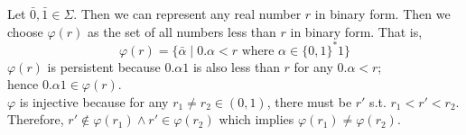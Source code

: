 \documentclass{report}
\begin{document}
Let $\bar{0}, \bar{1} \in \Sigma$. Then we can represent any real number $r$ in binary form.
Then we choose $\varphi(r)$ as the set of all numbers less than $r$ in binary form.
That is,
$$
\varphi(r) = \{\bar{\alpha} \mid 0.\alpha < r \text{ where } \alpha \in \{0,1\}^*1\}
$$
$\varphi(r)$ is persistent because $0.\alpha1$ is also less than $r$ for any $0.\alpha < r$;\\
hence $0.\alpha1 \in \varphi(r).$\\
$\varphi$ is injective because for any $r_1 \neq r_2 \in (0,1)$,
there must be $r'$ s.t. $r_1 <　r' < r_2$.
Therefore, $r' \notin \varphi(r_1) \land r' \in \varphi(r_2)$
which implies $\varphi(r_1) \neq \varphi(r_2)$.
\end{document}
